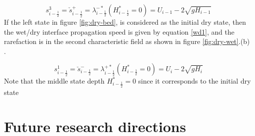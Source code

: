 \documentclass[11pt,a4paper]{article}
\begin{document}
	\begin{equation}
		s_{i-\frac{1}{2}}^{3} = \check{s}_{i-\frac{1}{2}}^{+} = \lambda_{i-\frac{1}{2}}^{-*}(H^{*}_{i-\frac{1}{2}}=0)= U_{i-1} - 2\sqrt{gH_{i-1}}
		\label{wd0}
	\end{equation}
	If the left state in figure \ref{fig:dry-bed}, is considered as the initial dry state, then the  wet/dry interface propagation  speed  is given by equation \eqref{wd1}, and the  rarefaction is in the second characteristic field  as shown in figure \ref{fig:dry-wet}.(b)  \cite{ge:2008}.
	
	\begin{equation}
		s_{i-\frac{1}{2}}^{1} = \check{s}_{i-\frac{1}{2}}^{-} = \lambda_{i-\frac{1}{2}}^{+*}(H^{*}_{i-\frac{1}{2}}=0)= U_{i} - 2\sqrt{gH_{i}}
		\label{wd1}
	\end{equation}
	Note that the middle state depth $H^{*}_{i-\frac{1}{2}}=0$ since it corresponds to the initial dry state
	\section{ Future research directions}
	
	
	
	

	\nocite{*}
	
	
	
	
\end{document}
